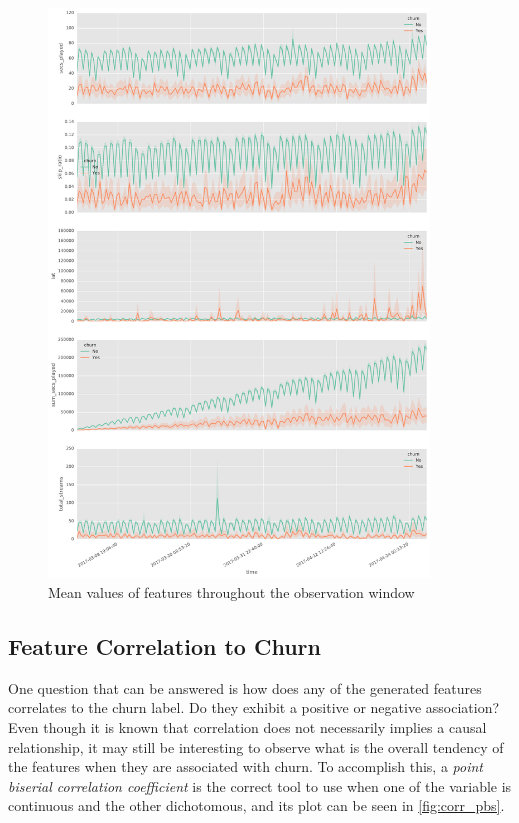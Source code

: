 \documentclass{kththesis}
\begin{document}
	\begin{figure}[h]
    \centering
    \includegraphics[width=0.9\textwidth,height=0.9\textheight,keepaspectratio]{figures/feats_time.pdf}
    \caption{Mean values of features throughout the observation window}
    \label{fig:featstime}
	\end{figure}

\subsection{Feature Correlation to Churn}

One question that can be answered is how does any of the generated features correlates to the churn label. Do they exhibit a positive or negative association? Even though it is known that correlation does not necessarily implies a causal relationship, it may still be interesting to observe what is the overall tendency of the features when they are associated with churn. To accomplish this, a \emph{point biserial correlation coefficient} is the correct tool to use when one of the variable is continuous and the other dichotomous, and its plot can be seen in \autoref{fig:corr_pbs}.
\end{document}
